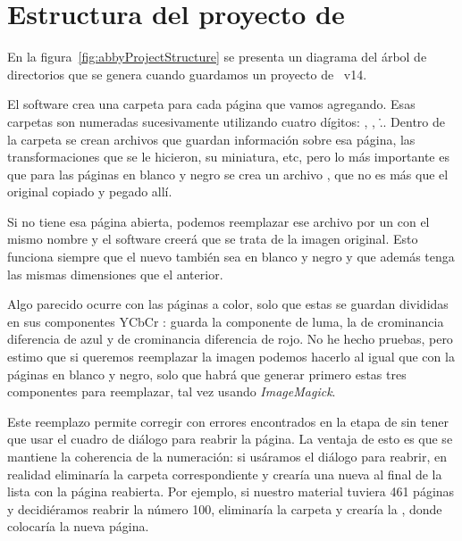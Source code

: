 \documentclass[%
	a5paper,
	10pt,
	twoside,
	openright,
	final,
]{memoir}
\begin{document}
\chapter{Estructura del proyecto de \label{sec:abbyProjectStructure}} En la figura~\ref{fig:abbyProjectStructure} se presenta un diagrama del árbol de directorios que se genera cuando guardamos un proyecto de \abby~v14.

El software crea una carpeta para cada página que vamos agregando. Esas carpetas son numeradas sucesivamente utilizando cuatro dígitos: , , \... Dentro de la carpeta se crean archivos que guardan información sobre esa página, las transformaciones que se le hicieron, su miniatura, etc, pero lo más importante es que para las páginas en blanco y negro se crea un archivo , que no es más que el \tiff original copiado y pegado allí.

Si \abby no tiene esa página abierta, podemos reemplazar ese archivo por un \tiff con el mismo nombre y el software creerá que se trata de la imagen original. Esto funciona siempre que el nuevo \tiff también sea en blanco y negro y que además tenga las mismas dimensiones que el anterior.

Algo parecido ocurre con las páginas a color, solo que estas se guardan divididas en sus componentes YCbCr \cite{YCbCr}:  guarda la componente de luma,  la de crominancia diferencia de azul y  de crominancia diferencia de rojo. No he hecho pruebas, pero estimo que si queremos reemplazar la imagen podemos hacerlo al igual que con la páginas en blanco y negro, solo que habrá que generar primero estas tres componentes para reemplazar, tal vez usando \emph{ImageMagick}.

Este reemplazo permite corregir con \scantailor errores encontrados en la etapa de \ocr sin tener que usar el cuadro de diálogo para reabrir la página. La ventaja de esto es que se mantiene la coherencia de la numeración: si usáramos el diálogo para reabrir, \abby en realidad eliminaría la carpeta correspondiente y crearía una nueva al final de la lista con la página reabierta. Por ejemplo, si nuestro material tuviera 461 páginas y decidiéramos reabrir la número 100, \abby eliminaría la carpeta  y crearía la , donde colocaría la nueva página.
\end{document}
